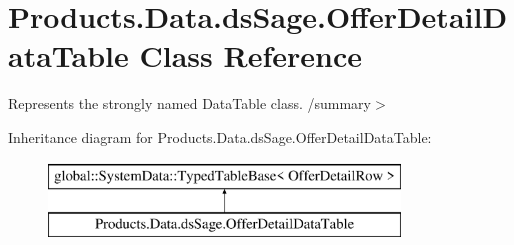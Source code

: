 \hypertarget{class_products_1_1_data_1_1ds_sage_1_1_offer_detail_data_table}{}\section{Products.\+Data.\+ds\+Sage.\+Offer\+Detail\+Data\+Table Class Reference}
\label{class_products_1_1_data_1_1ds_sage_1_1_offer_detail_data_table}


Represents the strongly named Data\+Table class. /summary$>$  


Inheritance diagram for Products.\+Data.\+ds\+Sage.\+Offer\+Detail\+Data\+Table\+:\begin{figure}[H]
\begin{center}
\leavevmode
\includegraphics[height=2.000000cm]{class_products_1_1_data_1_1ds_sage_1_1_offer_detail_data_table}
\end{center}
\end{figure}
